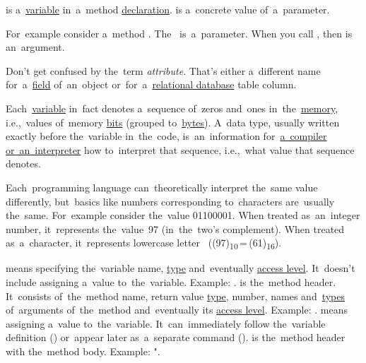 \label{parameterargument}
\begin{itemize}
     is a~\hyperref[variablefieldproperty]{variable} in~a~method \hyperref[declarationdefinition]{declaration}.
     is a~concrete value of~a~parameter.
\end{itemize}
For~example consider a~method .
The~ is~a~parameter.
When you call , then  is an~argument.

\warning Don't get confused by the~term \textit{attribute}.
That's either a~different name for~a~\hyperref[variablefieldproperty]{field} of~an~object or~for~a~\hyperref[relationaldatabase]{relational database} table column.

\label{datatypes}
Each~\hyperref[variablefieldproperty]{variable} in~fact denotes a~sequence of~zeros and~ones in~the~\hyperref[systemmemory]{memory}, i.e.,~values of~memory \hyperref[bitsandbytes]{bits} (grouped to~\hyperref[bitsandbytes]{bytes}).
A~data type, usually written exactly before the~variable in~the~code, is~an~information for~\hyperref[compiledinterpretedlanguages]{a~compiler or~an~interpreter} how to~interpret that sequence, i.e.,~what value that sequence denotes.

Each~programming language can~theoretically interpret the~same value differently, but~basics like numbers corresponding to~characters are~usually the~same.
For~example consider the~value 01100001.
When treated as~an~integer number, it~represents the~value~97 (in~the~two's complement).
When treated as~a~character, it~represents lowercase letter~ \mbox{((97)\textsubscript{10}\,=\,(61)\textsubscript{16})}.

\label{declarationdefinition}
\begin{itemize}
     means specifying the~variable name, \hyperref[datatypes]{type} and~eventually \hyperref[javaaccessmodifiers]{access level}.
            It~doesn't include assigning a~value to~the~variable.
            Example: .
     is the~method header.
            It~consists of~the~method name, return value \hyperref[datatypes]{type}, number, names and~\hyperref[datatypes]{types} of~arguments of~the~method and~eventually its \hyperref[javaaccessmodifiers]{access level}.
            Example: .
     means assigning a~value to~the~variable.
            It~can~immediately follow the~variable definition () or~appear later as~a~separate command ().
     is the~method header with the~method body.
            Example: ".
\end{itemize}

